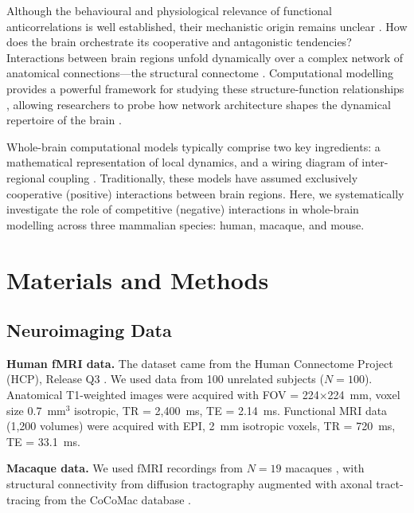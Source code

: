 \documentclass{article}
\begin{document}
Although the behavioural and physiological relevance of functional anticorrelations is well established, their mechanistic origin remains unclear \citep{fox2005human}. How does the brain orchestrate its cooperative and antagonistic tendencies? Interactions between brain regions unfold dynamically over a complex network of anatomical connections---the structural connectome \citep{sporns2013structure, zamora2023linking}. Computational modelling provides a powerful framework for studying these structure-function relationships \citep{honey2009predicting, deco2014great, kringelbach2024brain, naskar2021multiscale, breakspear2017dynamic, suarez2023learning, sanz2015mathematical}, allowing researchers to probe how network architecture shapes the dynamical repertoire of the brain \citep{deco2020brain, luppi2024unravelling, vasa2022computational, wang2021computational}.

Whole-brain computational models typically comprise two key ingredients: a mathematical representation of local dynamics, and a wiring diagram of inter-regional coupling \citep{breakspear2017dynamic, deco2014great}. Traditionally, these models have assumed exclusively cooperative (positive) interactions between brain regions. Here, we systematically investigate the role of competitive (negative) interactions in whole-brain modelling across three mammalian species: human, macaque, and mouse.

\section{Materials and Methods}

\subsection{Neuroimaging Data}

\textbf{Human fMRI data.} The dataset came from the Human Connectome Project (HCP), Release Q3 \citep{glasser2021human, vanessen2013wustl}. We used data from 100 unrelated subjects ($N=100$). Anatomical T1-weighted images were acquired with FOV = 224$\times$224~mm, voxel size 0.7~mm$^3$ isotropic, TR = 2,400~ms, TE = 2.14~ms. Functional MRI data (1,200 volumes) were acquired with EPI, 2~mm isotropic voxels, TR = 720~ms, TE = 33.1~ms.

\textbf{Macaque data.} We used fMRI recordings from $N=19$ macaques \citep{xu2020interindividual}, with structural connectivity from diffusion tractography augmented with axonal tract-tracing from the CoCoMac database \citep{kotter2004online}.
\end{document}

